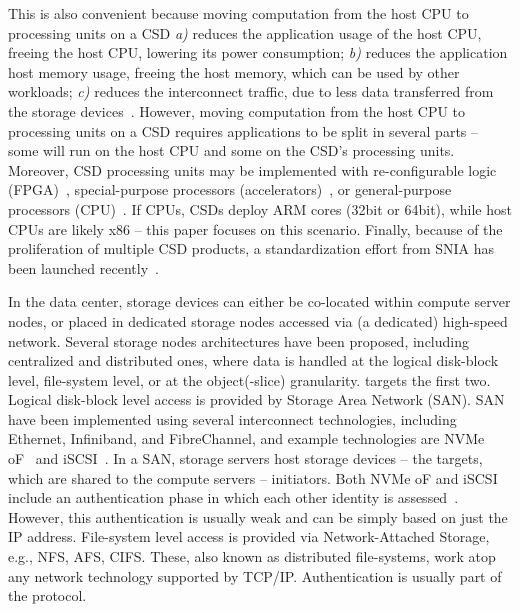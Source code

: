 This is also convenient because moving computation from the host CPU to processing units on a CSD
\emph{a)} reduces the application usage of the host CPU, freeing the host CPU, lowering its power consumption;
\emph{b)} reduces the application host memory usage, freeing the host memory, which can be used by other workloads;
\emph{c)} reduces the interconnect traffic, due to less data  transferred from the storage devices~\cite{cidrAntonio,blockNDP,jaeScale}. %
%
However, moving computation from the host CPU to processing units on a CSD requires applications to be split in several parts -- some will run on the host CPU and some on the CSD's processing units. Moreover, CSD processing units may be implemented with re-configurable logic (FPGA)~\cite{Samsung}, special-purpose processors (accelerators)~\cite{10.1145/3310149}, or general-purpose processors (CPU)~\cite{NGD}. If CPUs, CSDs deploy ARM cores (32bit or 64bit), while host CPUs are likely x86 -- this paper focuses on this scenario.
%
Finally, because of the proliferation of multiple CSD products, a standardization effort from SNIA has been launched recently~\cite{snia_cs}.


In the data center, storage devices can either be co-located within compute server nodes, or placed in  dedicated storage nodes accessed via (a dedicated) high-speed network. 
Several storage nodes architectures have been proposed, including centralized and distributed ones, where data is handled at the logical disk-block level, file-system level, or at the object(-slice) granularity.
\project{} targets the first two.
Logical disk-block level access is provided by Storage Area Network (SAN). SAN have been implemented using several interconnect technologies, including Ethernet, Infiniband, and FibreChannel, and example technologies are NVMe oF~\cite{nvme_specs,10.1145/3078468.3078483} and iSCSI~\cite{scsi_specs}.
In a SAN, storage servers host storage devices -- the targets, which are shared to the compute servers -- initiators. Both NVMe oF and iSCSI include an authentication phase in which each other identity is assessed~\cite{tcgswgsiis}. However, this authentication is usually weak and can be simply based on just the IP address.
File-system level access is provided via Network-Attached Storage, e.g., NFS, AFS, CIFS. These, also known as distributed file-systems, work atop any network technology supported by TCP/IP. Authentication is usually part of the protocol.


